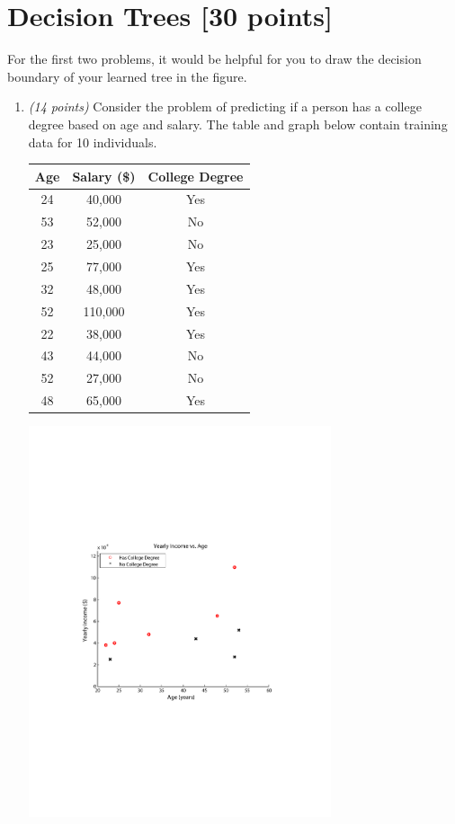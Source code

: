 \documentclass[letterpaper]{article}
\begin{document}
\section{Decision Trees [30 points]}
For the first two problems, it would be helpful for you to draw the decision boundary of your learned tree in the figure.
\begin{enumerate}
  \item
  \emph{(14 points)} Consider the problem of predicting if a person has a college degree based on
  	age and salary.  The table and graph below contain training data for 10 individuals.
  	
  \begin{center}
  	\begin{tabular}{|c|c|c|}
  	\hline
  	Age & Salary (\$) & College Degree \\
  	\hline
  	24 & 40,000 & Yes \\
  	53 & 52,000 & No \\
  	23 & 25,000 & No \\
  	25 & 77,000 & Yes \\
  	32 & 48,000 & Yes \\
  	52 & 110,000 & Yes \\
  	22 & 38,000 & Yes \\
  	43 & 44,000 & No \\
  	52 & 27,000 & No \\
  	48 & 65,000 & Yes \\
  	\hline
  	\end{tabular}
   \end{center}
   \begin{center}
   	\includegraphics[width=3.5in]{img/hw1-decision-tree.pdf}

\end{center}
\end{enumerate}
\end{document}
